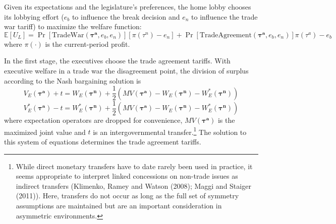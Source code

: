 \documentclass[10pt]{article}
\newcommand{\expect}{\mathbb{E}}
\newcommand{\bta}{\bm{\tau^a}}
\newcommand{\btn}{\bm{\tau^n}}
\begin{document}
Given its expectations and the legislature's preferences, the home lobby chooses its lobbying effort ($e_b$ to influence the break decision and $e_n$ to influence the trade war tariff) to maximize the welfare function:
\begin{equation}
  \expect \left[U_L \right] = \Pr\left[ \text{TradeWar}(\bta,e_b,e_n) \right] \left[ \pi(\tau^{\mathit{n}}) - e_n \right] + \Pr\left[ \text{TradeAgreement}(\bta,e_b,e_n) \right] \pi(\tau^a) - e_b
  \label{eq:lv}
\end{equation}
where $\pi(\cdot)$ is the current-period profit. 

In the first stage, the executives choose the trade agreement tariffs. With executive welfare in a trade war the disagreement point, the division of surplus according to the Nash bargaining solution is
\[
  V_E(\bta) + t = W_E(\btn) + \frac{1}{2} \left( MV(\bta) - W_E(\btn) - W_E^*(\btn) \right)
\]
\[
  V_E^*(\bta) - t = W_E^*(\btn) + \frac{1}{2} \left( MV(\bta) - W_E(\btn) - W_E^*(\btn) \right)
\]
where expectation operators are dropped for convenience, $MV(\bta)$ is the maximized joint value and $t$ is an intergovernmental transfer.\footnote{While direct monetary transfers have to date rarely been used in practice, it seems appropriate to interpret linked concessions on non-trade issues as indirect transfers (Klimenko, Ramey and Watson (2008); Maggi and Staiger (2011)). Here, transfers do not occur as long as the full set of symmetry assumptions are maintained but are an important consideration in asymmetric environments.} The solution to this system of equations determines the trade agreement tariffs.
\end{document}
